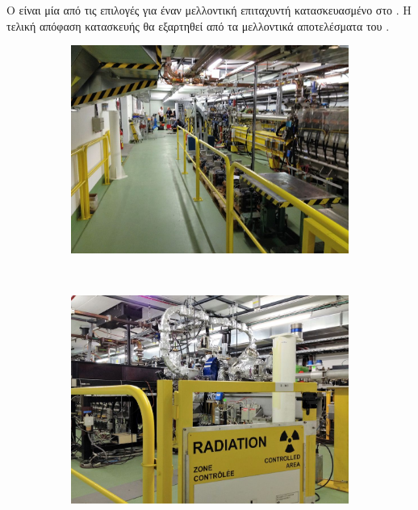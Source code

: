 Ο  είναι μία από τις επιλογές για έναν μελλοντική επιταχυντή κατασκευασμένο στο . Η τελική απόφαση κατασκευής θα εξαρτηθεί από τα μελλοντικά αποτελέσματα του .

\begin{figure}[h]
    \begin{subfigure}{0.5\textwidth}
		\centering
		\includegraphics[width=.9\linewidth]{images/CLIC-CTF3-overview.jpg}
    \end{subfigure}
	~
    \begin{subfigure}{0.5\textwidth}
		\centering
		\includegraphics[width=.9\linewidth]{images/CLIC-CTF3-radiation.jpg}
    \end{subfigure}
	\par\bigskip
    \begin{subfigure}{0.5\textwidth}
		\centering

\end{subfigure}
\end{figure}
